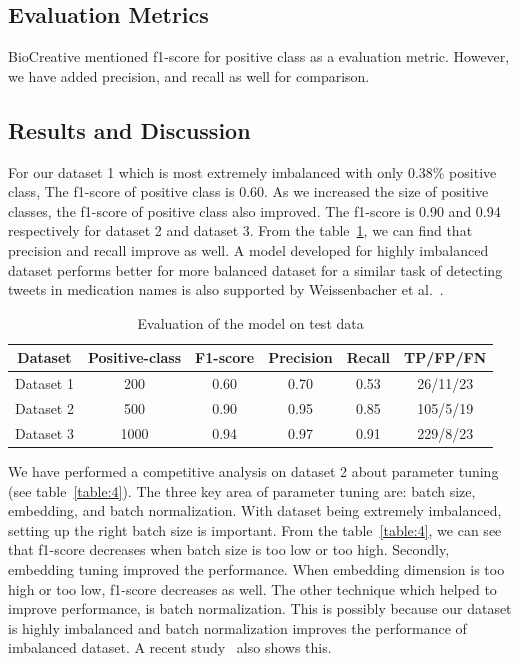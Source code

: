 \subsection{Evaluation Metrics}
BioCreative mentioned f1-score for positive class as a evaluation metric. However, we have added precision, and recall as well for comparison.

\subsection{Results and Discussion}
For our dataset 1 which is most extremely imbalanced with only 0.38\% positive class, The f1-score of positive class is 0.60. As we increased the size of positive classes, the f1-score of positive class also improved. The f1-score is 0.90 and 0.94 respectively for dataset 2 and dataset 3. From the table~\ref{table:3}, we can find that precision and recall improve as well. A model developed for highly imbalanced dataset performs better for more balanced dataset for a similar task of detecting tweets in medication names is also supported by Weissenbacher et al.~\cite{weissenbacher2019deep}.

\begin{table}[h!]
	\centering
	\begin{tabular}{||c c c c c c||} 
		\hline
		Dataset & Positive-class & F1-score & Precision & Recall & TP/FP/FN \\ [0.5ex] 
		\hline\hline
		Dataset 1 & 200 & 0.60 & 0.70 & 0.53 & 26/11/23 \\ 
		Dataset 2 & 500 & 0.90 & 0.95 & 0.85 & 105/5/19 \\
		Dataset 3 & 1000 & 0.94 & 0.97 & 0.91 & 229/8/23 \\
		\hline
	\end{tabular}
	\caption{Evaluation of the model on test data}
	\label{table:3}
\end{table}

We have performed a competitive analysis on dataset 2 about parameter tuning (see table~\ref{table:4}). The three key area of parameter tuning are: batch size, embedding, and batch normalization. With dataset being extremely imbalanced, setting up the right batch size is important. From the table~\ref{table:4}, we can see that f1-score decreases when batch size is too low or too high. Secondly, embedding tuning improved the performance. When embedding dimension is too high or too low, f1-score decreases as well. The other technique which helped to improve performance, is batch normalization. This is possibly because our dataset is highly imbalanced and batch normalization improves the performance of imbalanced dataset. A recent study~\cite{kocaman2020improving} also shows this.

